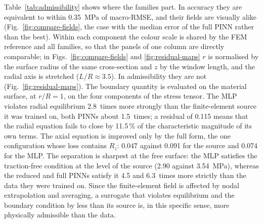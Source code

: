 \documentclass[subscriptcorrection,upint,varvw,barcolor=Goldenrod3,mathalfa=cal=euler,balance,hyphenate,french,pdf-a]{asmejour} %
\begin{document}
Table~\ref{tab:admissibility} shows where the families part. In accuracy they are equivalent to within 0.35~MPa of macro-RMSE, and their fields are visually alike (Fig.~\ref{fig:compare-fields}, the case with the median error of the full PINN rather than the best). Within each component the colour scale is shared by the FEM reference and all families, so that the panels of one column are directly comparable; in Figs.~\ref{fig:compare-fields} and \ref{fig:residual-maps} $r$ is normalised by the surface radius of the same cross-section and $z$ by the window length, and the radial axis is stretched ($L/R \approx 3.5$). %
In admissibility they are not (Fig.~\ref{fig:residual-maps}). The boundary quantity is evaluated on the material surface, at $r/R = 1$, on the four components of the stress tensor.
The MLP violates radial equilibrium 2.8~times more strongly than the finite-element source it was trained on, both PINNs about 1.5~times; a residual of 0.115 means that the radial equation fails to close by 11.5\,\% of the characteristic magnitude of its own terms. The axial equation is improved only by the full form, the one configuration whose loss contains $R_z$: 0.047 against 0.091 for the source and 0.074 for the MLP. The separation is sharpest at the free surface: the MLP satisfies the traction-free condition at the level of the source (2.90 against 3.54~MPa), whereas the reduced and full PINNs satisfy it 4.5 and 6.3~times more strictly than the data they were trained on. Since the finite-element field is affected by nodal extrapolation and averaging, a surrogate that violates equilibrium and the boundary condition by less than its source is, in this specific sense, more physically admissible than the data.
\end{document}
